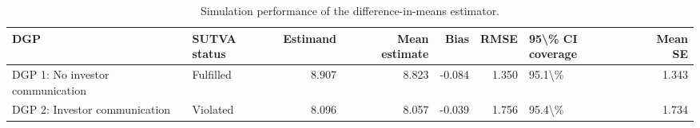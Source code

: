 \begin{table}

\caption{Simulation performance of the difference-in-means estimator.}
\centering
\begin{tabular}[t]{llrrrrlr}
\toprule
DGP & SUTVA status & Estimand & Mean estimate & Bias & RMSE & 95\textbackslash{}\% CI coverage & Mean SE\\
\midrule
DGP 1: No investor communication & Fulfilled & 8.907 & 8.823 & -0.084 & 1.350 & 95.1\textbackslash{}\% & 1.343\\
DGP 2: Investor communication & Violated & 8.096 & 8.057 & -0.039 & 1.756 & 95.4\textbackslash{}\% & 1.734\\
\bottomrule
\end{tabular}
\end{table}
